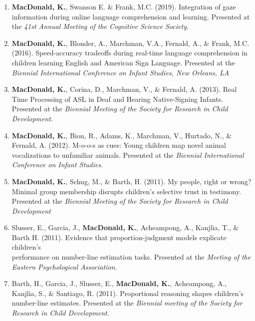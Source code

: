 \documentclass[10pt]{article}
\begin{document}
\begin{enumerate}[resume]
        \item {\bf MacDonald, K.}, Swanson E. \& Frank, M.C. (2019). Integration of gaze \\information during online language 
        comprehension and learning. Presented at the \emph{41st Annual Meeting of the Cognitive Science Society.}

        \item {\bf MacDonald, K.}, Blonder, A., Marchman, V.A., Fernald, A., \& Frank, M.C. (2016). 
        Speed-accuracy tradeoffs during real-time language comprehension in children learning English and American Sign Language. 
        Presented at the \textit{Biennial International Conference on Infant Studies, New Orleans, LA}

        \item {\bf MacDonald, K.}, Corina, D., Marchman, V., \& Fernald, A. (2013). Real Time Processing of ASL 
        in Deaf and Hearing Native-Signing Infants. Presented at the \emph{Biennial Meeting of the Society for Research in 
        Child Development}.

        \item {\bf MacDonald, K.}, Bion, R., Adams, K., Marchman, V., Hurtado, N., \& Fernald, A. (2012). 
        M-o-o-s as cues: Young children map novel animal vocalizations to unfamiliar animals. Presented at the 
        \emph{Biennial International Conference on Infant Studies.}

        \item {\bf MacDonald, K.}, Schug, M., \& Barth, H. (2011). My people, right or wrong? Minimal group 
        membership disrupts children's selective trust in testimony. \\Presented at the \emph{Biennial Meeting of 
        the Society for Research in Child Development}

        \item Slusser, E., Garcia, J., \textbf{MacDonald, K.}, Acheampong, A., Kanjlia, T., \& Barth H. (2011). 
        Evidence that proportion-judgment models explicate children's \\ performance on number-line estimation tasks. 
        Presented at the \emph{Meeting of the Eastern Psychological Association}.

        \item Barth, H., Garcia, J., Slusser, E., {\bf MacDonald, K.}, Acheampong, A., Kanjlia, S., \& Santiago, R. (2011). 
        Proportional reasoning shapes children's number-line estimates. Presented at the \emph{Biennial meeting of the 
        Society for Research in Child Development}.


\end{enumerate}
\end{document}
